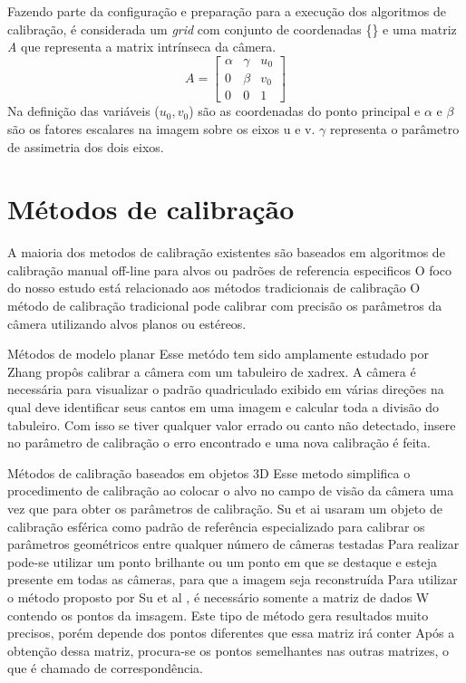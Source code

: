 \documentclass[portuguese]{sbrt}
\begin{document}
Fazendo parte da configuração e preparação para a execução dos algoritmos de calibração, é considerada um \textit{grid} com conjunto de coordenadas \{\} e uma matriz \textit{A} que representa a matrix intrínseca da câmera.
  $$
  A =
  \begin{bmatrix}
   \alpha & \gamma & u_{0}\\ 
   0      & \beta  & v_{0}\\
   0      & 0      & 1    
  \end{bmatrix}
  $$
\newline
  Na definição das variáveis ($u_{0}, v_{0}$) são as coordenadas do ponto principal e $\alpha$ e $\beta$ são os fatores escalares na imagem sobre os eixos u e v. $\gamma$ representa o parâmetro de assimetria dos dois eixos.
\section{Métodos de calibração}
\label{sec:metodos}

A maioria dos metodos de calibração existentes são baseados em algoritmos de
calibração manual off-line para alvos ou padrões de referencia especificos
O foco do nosso estudo está relacionado aos métodos tradicionais de calibração
O método de calibração tradicional pode calibrar com precisão os parâmetros da câmera
utilizando alvos planos ou estéreos. 

Métodos de modelo planar
Esse metódo tem sido amplamente estudado por Zhang \cite{Zhang} propôs calibrar a câmera com um tabuleiro de xadrex.
A câmera é necessária para visualizar o padrão quadriculado exibido em várias direções
na qual deve identificar seus cantos em uma imagem e calcular toda a divisão do tabuleiro. 
Com isso se tiver qualquer valor errado ou canto não detectado, insere no parâmetro de calibração o erro encontrado e uma nova calibração é feita.

Métodos de calibração baseados em objetos 3D
Esse metodo simplifica o procedimento de calibração ao colocar o alvo no campo de visão da câmera uma vez que para obter os parâmetros de calibração.
Su et ai \cite{Svoboda}usaram um objeto de calibração esférica como padrão de referência especializado para calibrar os parâmetros geométricos entre qualquer número de câmeras testadas 
Para realizar pode-se utilizar um ponto brilhante ou um ponto em que se destaque e esteja presente em todas as câmeras, para que a imagem seja reconstruída
Para utilizar o método proposto por Su et al \cite{Svoboda}, é necessário somente a matriz de dados W contendo os pontos da imsagem.
Este tipo de método gera resultados muito precisos, porém depende dos pontos diferentes que essa matriz irá conter
Após a obtenção dessa matriz, procura-se os pontos semelhantes nas outras matrizes, o que é chamado de correspondência.
\end{document}
